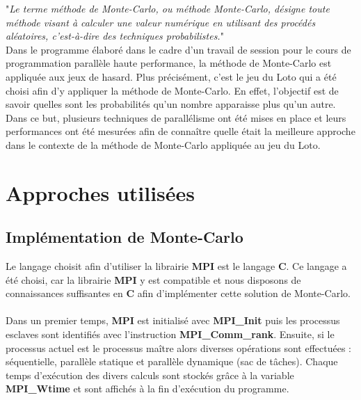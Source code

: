 \documentclass[a4paper,12pt]{article}
\begin{document}
"\textit{Le terme méthode de Monte-Carlo, ou méthode Monte-Carlo, désigne toute méthode visant à calculer une valeur numérique en utilisant des procédés aléatoires, c'est-à-dire des techniques probabilistes.}" \cite{wiki:montecarlo}
\\
\indent Dans le programme élaboré dans le cadre d'un travail de session pour le cours de programmation parallèle haute performance, la méthode de Monte-Carlo est appliquée aux jeux de hasard.
Plus précisément, c'est le jeu du Loto qui a été choisi afin d'y appliquer la méthode de Monte-Carlo. En effet, l'objectif est de savoir quelles sont les probabilités qu'un nombre apparaisse plus qu'un autre. Dans ce but, plusieurs techniques de parallélisme ont été mises en place et leurs performances ont été mesurées afin de connaître quelle était la meilleure approche dans le contexte de la méthode de Monte-Carlo appliquée au jeu du Loto. 


\section{Approches utilisées}

\subsection{Implémentation de Monte-Carlo}
Le langage choisit afin d'utiliser la librairie \textbf{MPI} est le langage \textbf{C}. Ce langage a été choisi, car la librairie \textbf{MPI} y est compatible et nous disposons de connaissances suffisantes en \textbf{C} afin d'implémenter cette solution de Monte-Carlo. 
\\\\
\indent Dans un premier temps, \textbf{MPI} est initialisé avec \textbf{MPI\_Init} puis les processus esclaves sont identifiés avec l'instruction \textbf{MPI\_Comm\_rank}. Ensuite, si le processus actuel est le processus maître alors diverses opérations sont effectuées : séquentielle, parallèle statique et parallèle dynamique (sac de tâches). Chaque temps d'exécution des divers calculs sont stockés grâce à la variable \textbf{MPI\_Wtime} et sont affichés à la fin d'exécution du programme.
\end{document}
